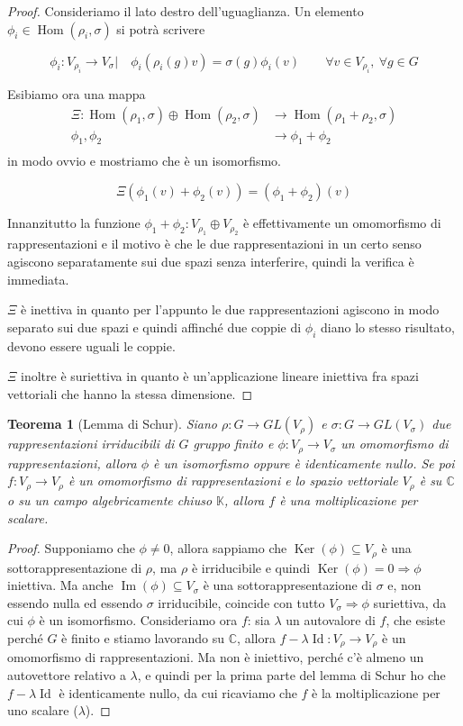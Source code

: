 \documentclass[11pt]{article}
\theoremstyle{plain}
\newtheorem{thm}{Teorema}[section]
\theoremstyle{definition}
\theoremstyle{remark}
\newcommand{\C}{\mathbb{C}}
\newcommand{\K}{\mathbb{K}}
\DeclareMathOperator{\Hom}{Hom}
\DeclareMathOperator{\Ker}{Ker}
\DeclareMathOperator{\Imm}{Im}
\DeclareMathOperator{\Id}{Id}
\begin{document}
\begin{proof}
Consideriamo il lato destro dell'uguaglianza. Un elemento $\phi_i \in \Hom(\rho_i, \sigma)$ si potrà scrivere

\[
\phi_i :V_{\rho_i} \to V_\sigma | \quad \phi_i\left( \rho_i(g) v\right) = \sigma(g) \phi_i(v) \qquad \forall v \in V_{\rho_i}, \ \forall g \in G
\]

Esibiamo ora una mappa
\begin{align*}
\Xi :  \Hom(\rho_1, \sigma) \oplus \Hom(\rho_2, \sigma) &\to \Hom(\rho_1 + \rho_2, \sigma) \\
\phi_1 , \phi_2                                       &\to \phi_1 + \phi_2 \\
\end{align*}
 in modo ovvio e mostriamo che è un isomorfismo.

\[ \Xi (\phi_1(v) + \phi_2(v)) = (\phi_1 + \phi_2) (v) \]


Innanzitutto la funzione $\phi_1 + \phi_2 : V_{\rho_1} \oplus V_{\rho_2}$ è effettivamente un omomorfismo di rappresentazioni e il motivo è che le due rappresentazioni in un certo senso agiscono separatamente sui due spazi senza interferire, quindi la verifica è immediata.

$\Xi$ è inettiva in quanto per l'appunto le due rappresentazioni agiscono in modo separato sui due spazi e quindi affinché due coppie di $\phi_i$ diano lo stesso risultato, devono essere uguali le coppie.

$\Xi$ inoltre è suriettiva in quanto è un'applicazione lineare iniettiva fra spazi vettoriali che hanno la stessa dimensione.

\end{proof}


\begin{thm}[Lemma di Schur]
Siano $\rho: G \to GL(V_\rho)$ e $\sigma: G \to GL(V_\sigma)$ due rappresentazioni irriducibili di $G$ gruppo finito e $\phi:V_\rho \to V_\sigma$ un omomorfismo di rappresentazioni, allora $\phi$ è un isomorfismo oppure è identicamente nullo. Se poi $f:V_\rho\to V_\rho$ è un omomorfismo di rappresentazioni e lo spazio vettoriale $V_\rho$ è su $\C$ o su un campo algebricamente chiuso $\K$, allora $f$ è una moltiplicazione per scalare.
\end{thm}
\begin{proof}
Supponiamo che $\phi\neq 0$, allora sappiamo che $\Ker(\phi)\subseteq V_\rho$ è una sottorappresentazione di $\rho$, ma $\rho$ è irriducibile e quindi $\Ker(\phi)=0\Rightarrow \phi$ iniettiva. Ma anche $\Imm(\phi)\subseteq V_{\sigma}$ è una sottorappresentazione di $\sigma$ e, non essendo nulla ed essendo $\sigma$ irriducibile, coincide con tutto $V_\sigma \Rightarrow \phi$ suriettiva, da cui $\phi$ è un isomorfismo.
Consideriamo ora $f$: sia $\lambda$ un autovalore di $f$, che esiste perché $G$ è finito e stiamo lavorando su $\C$, allora $f-\lambda \Id:V_\rho\to V_\rho$ è un omomorfismo di rappresentazioni. Ma non è iniettivo, perché c'è almeno un autovettore relativo a $\lambda$, e quindi per la prima parte del lemma di Schur ho che $f-\lambda \Id$ è identicamente nullo, da cui ricaviamo che $f$ è la moltiplicazione per uno scalare ($\lambda$).
\end{proof}
\end{document}
